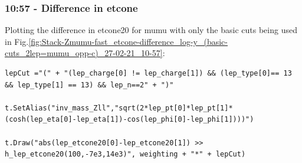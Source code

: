 \subsubsection*{10:57 - Difference in etcone}
Plotting the difference in etcone20 for mumu with only the basic cuts being used in Fig.\ref{fig:Stack-Zmumu-fast_etcone-difference_log-y_(basic-cuts_2lep=mumu_opp-c)_27-02-21_10-57}:
\begin{lstlisting}
lepCut ="(" + "(lep_charge[0] != lep_charge[1]) && (lep_type[0]== 13 && lep_type[1] == 13) && lep_n==2" + ")"    
    
t.SetAlias("inv_mass_Zll","sqrt(2*lep_pt[0]*lep_pt[1]*(cosh(lep_eta[0]-lep_eta[1])-cos(lep_phi[0]-lep_phi[1])))")
    
t.Draw("abs(lep_etcone20[0]-lep_etcone20[1]) >> h_lep_etcone20(100,-7e3,14e3)", weighting + "*" + lepCut)
\end{lstlisting}


